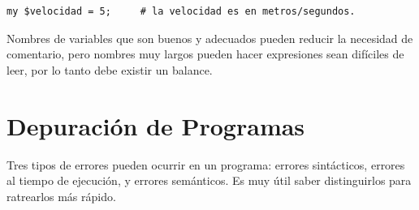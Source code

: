 \begin{lstlisting}
my $velocidad = 5;     # la velocidad es en metros/segundos. 
\end{lstlisting}
%
Nombres de variables que son buenos y adecuados pueden reducir la necesidad 
de comentario, pero nombres muy largos pueden hacer expresiones sean difíciles
de leer, por lo tanto debe existir un balance.


\section{Depuración de Programas}

Tres tipos de errores pueden ocurrir en un programa: errores
sintácticos, errores al tiempo de ejecución, y  errores semánticos.
Es muy útil saber distinguirlos para ratrearlos más rápido.

